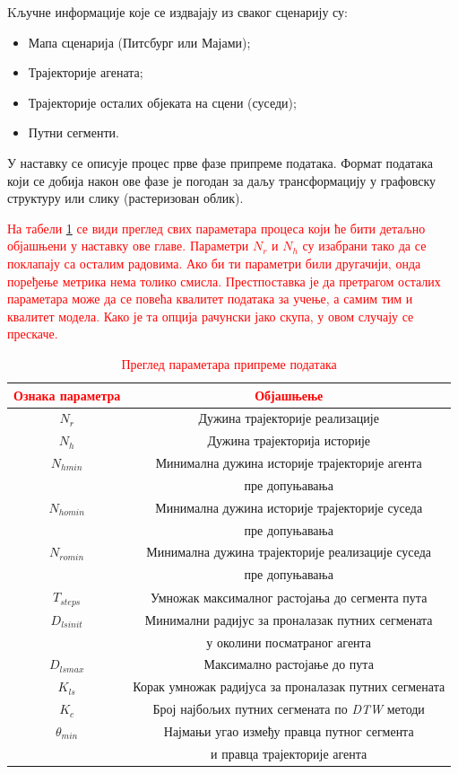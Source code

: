 \documentclass[11pt,oneside]{memoir}
\begin{document}
\noindent Kључне информације које се издвајају из сваког сценарију су:
\begin{itemize}
  \item Мапа сценарија (Питсбург или Мајами);
  \item Трајекторије агената;
  \item Трајекторије осталих објеката на сцени (суседи);
  \item Путни сегменти.
\end{itemize}

У наставку се описује процес прве фазе припреме података. Формат података који се добија након ове фазе је погодан
за даљу трансформацију у графовску структуру или слику (растеризован облик).

\textcolor{red}{На табели \ref{dp-params-table} се види преглед свих параметара процеса који ће 
бити детаљно објашњени у наставку ове главе. Параметри $N_r$ и $N_h$ су изабрани тако да се поклапају
са осталим радовима. Ако би ти параметри били другачији, онда поређење метрика нема толико смисла. 
Престпоставка је да претрагом осталих параметара може да се повећа квалитет података за учење, а самим тим
и квалитет модела. Како је та опција рачунски јако скупа, у овом случају се прескаче.}

\begin{table}[H]
  \centering
  \begin{tabular}{c|c}
    \textcolor{red}{Ознака параметра} & \textcolor{red}{Објашњење} \\
    \hline
    $N_r$ & Дужина трајекторије реализације \\
    \hline
    $N_h$ & Дужина трајекторија историје \\
    \hline
    $N_{hmin}$ & Минимална дужина историје трајекторије агента \\
    & пре допуњавања \\
    \hline
    $N_{homin}$ & Минимална дужина историје трајекторије суседа \\
    & пре допуњавања \\
    \hline
    $N_{romin}$ & Минимална дужина трајекторије реализације суседа \\
    & пре допуњавања \\
    \hline
    $T_{steps}$ & Умножак максималног растојања до сегмента пута \\
    \hline
    $D_{lsinit}$ & Минимални радијус за проналазак путних сегмената \\
    & у околини посматраног агента \\
    \hline
    $D_{lsmax}$ & Максимално растојање до пута \\
    \hline
    $K_{ls}$ & Корак умножак радијуса за проналазак путних сегмената \\
    \hline
    $K_c$ & Број најбољих путних сегмената по \textit{DTW} методи \\
    \hline
    $\theta_{min}$ & Најмањи угао између правца путног сегмента \\
    & и правца трајекторије агента
  \end{tabular}
  \caption{\textcolor{red}{Преглед параметара припреме података}}
  \label{dp-params-table}
\end{table}
\end{document}
